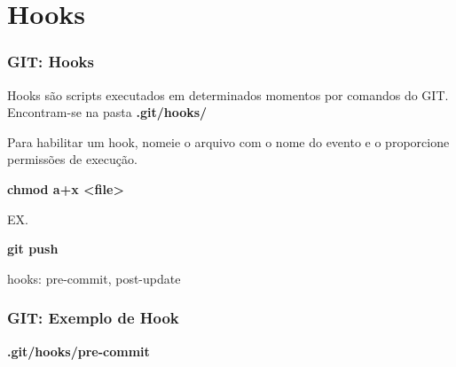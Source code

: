 \section{Hooks}
\begin{frame}
\frametitle{GIT: Hooks}

Hooks são scripts executados em determinados momentos por comandos do GIT. Encontram-se na pasta \textbf{.git/hooks/}

Para habilitar um hook, nomeie o arquivo com o nome do evento e o proporcione permissões de execução.

\textbf{chmod a+x <file>}

EX.

\textbf{git push}

hooks: pre-commit, post-update
\end{frame}

\begin{frame}
\frametitle{GIT: Exemplo de Hook}

\textbf{.git/hooks/pre-commit}
\scriptsize

\normalsize
\end{frame}

